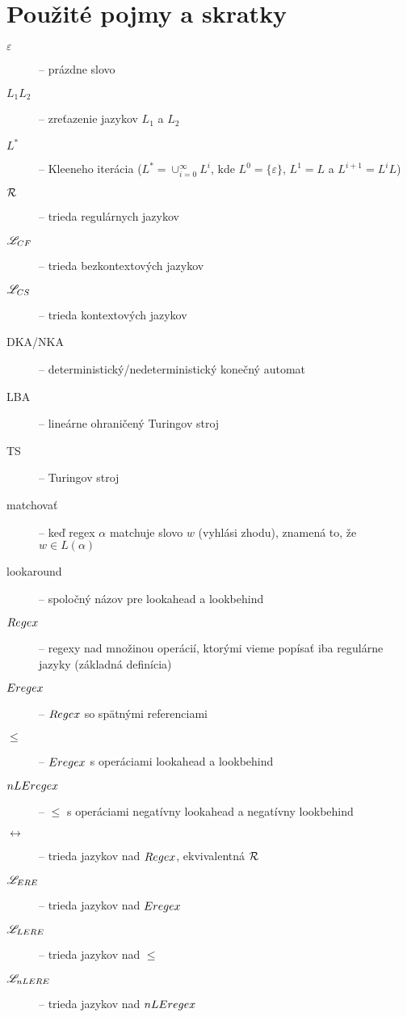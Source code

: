 \chapter*{Použité pojmy a skratky}
\label{chap:pojmy}
{}

\begin{description}
\item[$\varepsilon$] -- prázdne slovo
\item[$ L_{1}L_{2} $] -- zreťazenie jazykov $ L_{1} $ a $ L_{2} $
\item[$ L^* $] -- Kleeneho iterácia ($L^*=\cup^{\infty}_{i=0}L^i$, kde $L^0=\lbrace \varepsilon \rbrace$, $L^1=L$ a $L^{i+1}=L^iL$)
\item[$ {\cal R} $] -- trieda regulárnych jazykov
\item[$ \mathscr{L}_{CF}$] -- trieda bezkontextových jazykov
\item[$ \mathscr{L}_{CS}$] -- trieda kontextových jazykov
\item[DKA/NKA] -- deterministický/nedeterministický konečný automat
\item[LBA] -- lineárne ohraničený Turingov stroj
\item[TS] -- Turingov stroj
\item[matchovať] -- keď regex $\alpha$ matchuje slovo $w$ (vyhlási zhodu), znamená to, že $w\in L(\alpha)$
\item[lookaround] -- spoločný názov pre lookahead a lookbehind

\item[$Regex$] -- regexy nad množinou operácií, ktorými vieme popísať iba regulárne jazyky (základná definícia)
\item[$Eregex$] -- $Regex$ so spätnými referenciami
\item[$\le$] -- $Eregex$ s operáciami lookahead a lookbehind
\item[$nLEregex$] -- $\le$ s operáciami negatívny lookahead a negatívny lookbehind
\item[$\rel$] -- trieda jazykov nad $Regex$, ekvivalentná ${\cal R}$
\item[$\mathscr{L}_{ERE}$] -- trieda jazykov nad $Eregex$
\item[$\mathscr{L}_{LERE}$] -- trieda jazykov nad $\le$
\item[$\mathscr{L}_{nLERE}$] -- trieda jazykov nad $nLEregex$
\end{description}
